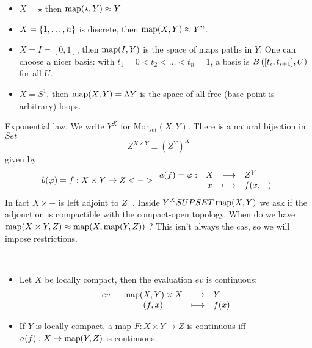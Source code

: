     \begin{examples}
        \begin{itemize}
            \item $X = \star$ then $\operatorname{map}(\star, Y) \approx Y$
            \item $X = \left\{ 1, \dots, n \right\}$ is discrete, then $\operatorname{map}(X, Y) \approx Y^n$.
            \item $X = I = [0, 1]$, then $\operatorname{map}(I, Y)$ is the space of maps paths in $Y$.
                One can choose a nicer basis: with $t_1 = 0 < t_2 < \dots < t_n = 1$,
                a basis is $B\left([t_i, t_{i+1}], U\right)$ for all $U$.
            \item $X = S^1$, then $\operatorname{map}(X, Y) = \Lambda Y$ is the space of all free (base point is arbitrary) loops.
        \end{itemize}
    \end{examples}

    \begin{remark}
        Exponential law. We write $Y^X$ for $\mathrm{Mor}_{set}(X, Y)$.
        There is a natural bijection in $Set$
        \[
            Z^{X \times Y} \equiv {(Z^Y)}^X
        \]
        given by
        \[
            b(\varphi) = f: X\times Y \to Z
            <-> 
            \begin{array}{rccl} a(f) = \varphi : & X & \longrightarrow & Z^Y \\ & x & \longmapsto & f(x, -) \end{array}
        \]
        In fact $X \times -$ is left adjoint to $Z^-$.
        Inside $Y^X SUPSET \operatorname{map}(X, Y)$ we ask if the adjonction 
        is compactible with the compact-open topology.
        When do we have $\operatorname{map}(X \times Y, Z) \approx \operatorname{map}(X, \operatorname{map}(Y, Z))$ ?
        This isn't always the cas, so we will impose restrictions.
    \end{remark}

    \begin{proposition}~
        \begin{itemize}
            \item Let $X$ be locally compact, then the evaluation $ev$ is continuous:
            \[
                \begin{array}{rccl} ev : & \operatorname{map}(X, Y) \times X & \longrightarrow & Y \\ & (f, x) & \longmapsto & f(x) \end{array}
            \]
            \item If $Y$ is locally compact, a map $F: X \times Y \to Z$ is continuous
                iff $a(f): X \to \operatorname{map}(Y, Z)$ is continuous.
        \end{itemize}
    \end{proposition}

